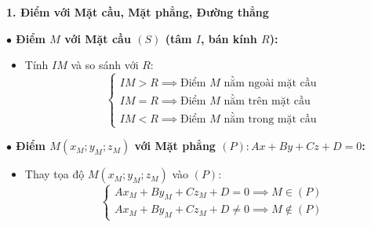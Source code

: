 \documentclass[12pt,a4paper]{article}
\begin{document}
\vspace{0.15cm}

\begin{theorybox}
    \textbf{\textcolor{deepblue}{\large 1. Điểm với Mặt cầu, Mặt phẳng, Đường thẳng}}
    \par\vspace{6pt}

    \textbf{\textcolor{amberorange}{$\bullet$ Điểm $M$ với Mặt cầu $(S)$ (tâm $I$, bán kính $R$):}}
    \begin{itemize}
        \item Tính $IM$ và so sánh với $R$:
        \[
            \begin{cases}
                IM > R \implies \text{Điểm } M \text{ nằm ngoài mặt cầu} \\
                IM = R \implies \text{Điểm } M \text{ nằm trên mặt cầu} \\
                IM < R \implies \text{Điểm } M \text{ nằm trong mặt cầu}
            \end{cases}
        \]
    \end{itemize}

    \textbf{\textcolor{amberorange}{$\bullet$ Điểm $M(x_M; y_M; z_M)$ với Mặt phẳng $(P)\colon Ax + By + Cz + D = 0$:}}
    \begin{itemize}
        \item Thay tọa độ $M(x_M; y_M; z_M)$ vào $(P)$:
        \[
            \begin{cases}
                Ax_M + By_M + Cz_M + D = 0 \implies M \in (P) \\
                Ax_M + By_M + Cz_M + D \neq 0 \implies M \notin (P)
            \end{cases}
        \]
    \end{itemize}


\end{theorybox}
\end{document}
